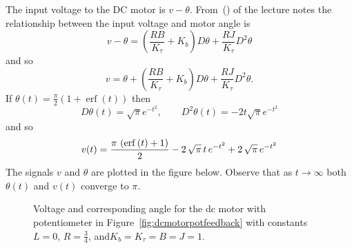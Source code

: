 \begin{excersizelist}
\begin{solution}
The input voltage to the DC motor is $v - \theta$.  From~() of the lecture notes the relationship between the input voltage and motor angle is
\[
v - \theta = \left(\frac{RB}{K_\tau} + K_b\right) D\theta + \frac{RJ}{K_\tau} D^2\theta
\] 
and so
\[
v = \theta + \left(\frac{RB}{K_\tau} + K_b\right) D\theta + \frac{RJ}{K_\tau} D^2\theta.
\]
If $\theta(t) = \frac{\pi}{2} (1 + \operatorname{erf}(t) )$ then
\[
D\theta(t) = \sqrt{\pi} e^{-t^2}, \qquad D^2\theta(t) = -2t \sqrt{\pi} e^{-t^2}
\]
and so
\[
v(t) = {{\pi\,\left(\mathrm{erf}\left(t\right)+1\right)}\over{2}}-2\,
 \sqrt{\pi}\,t\,e^ {- t^2 }+2\,\sqrt{\pi}\,e^ {- t^2 }
\]
The signals $v$ and $\theta$ are plotted in the figure below.  Observe that as $t \to \infty$ both $\theta(t)$ and $v(t)$ converge to $\pi$.

\begin{figure}[tp]
  \centering
  \caption{Voltage and corresponding angle for the dc motor with potentiometer in Figure~\ref{fig:dcmotorpotfeedback} with constants $L =0$, $R = \tfrac{3}{4}$, and$K_b=K_\tau=B=J=1$.} \label{fig:dcmotorpotfeedbackdcmotoranim}
\end{figure}






\end{solution}
\end{excersizelist}
